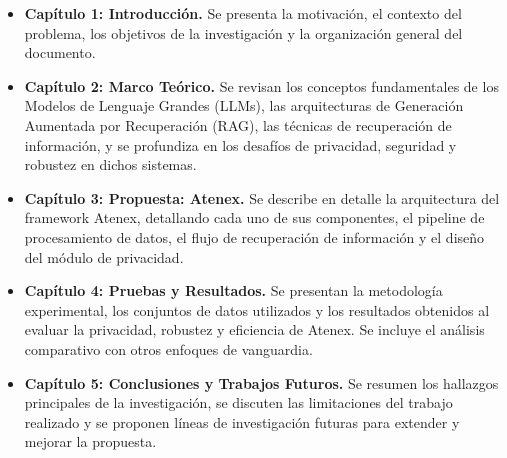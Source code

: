 \begin{itemize}
    \item \textbf{Capítulo 1: Introducción.} Se presenta la motivación, el contexto del problema, los objetivos de la investigación y la organización general del documento.
    \item \textbf{Capítulo 2: Marco Teórico.} Se revisan los conceptos fundamentales de los Modelos de Lenguaje Grandes (LLMs), las arquitecturas de Generación Aumentada por Recuperación (RAG), las técnicas de recuperación de información, y se profundiza en los desafíos de privacidad, seguridad y robustez en dichos sistemas.
    \item \textbf{Capítulo 3: Propuesta: Atenex.} Se describe en detalle la arquitectura del framework Atenex, detallando cada uno de sus componentes, el pipeline de procesamiento de datos, el flujo de recuperación de información y el diseño del módulo de privacidad.
    \item \textbf{Capítulo 4: Pruebas y Resultados.} Se presentan la metodología experimental, los conjuntos de datos utilizados y los resultados obtenidos al evaluar la privacidad, robustez y eficiencia de Atenex. Se incluye el análisis comparativo con otros enfoques de vanguardia.
    \item \textbf{Capítulo 5: Conclusiones y Trabajos Futuros.} Se resumen los hallazgos principales de la investigación, se discuten las limitaciones del trabajo realizado y se proponen líneas de investigación futuras para extender y mejorar la propuesta.
\end{itemize}